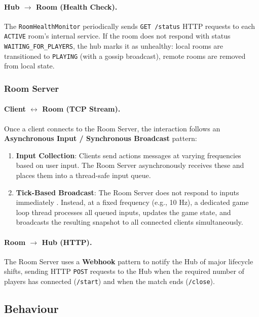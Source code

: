 \paragraph{Hub $\rightarrow$ Room (Health Check).}
The \texttt{RoomHealthMonitor} periodically sends \texttt{GET /status} HTTP requests to each \texttt{ACTIVE} room's internal service.
If the room does not respond with status \texttt{WAITING\_FOR\_PLAYERS}, the hub marks it as unhealthy: local rooms are transitioned to \texttt{PLAYING} (with a gossip broadcast), remote rooms are removed from local state.

\subsubsection{Room Server}

\paragraph{Client $\leftrightarrow$ Room (TCP Stream).}
Once a client connects to the Room Server, the interaction follows an \textbf{Asynchronous Input / Synchronous Broadcast} pattern:
\begin{enumerate}
  \item \textbf{Input Collection}: Clients send actions messages at varying frequencies based on user input. 
  The Room Server asynchronously receives these and places them into a thread-safe input queue.
  \item \textbf{Tick-Based Broadcast}: The Room Server does not respond to inputs immediately \cite{nystrom2014game}.
  Instead, at a fixed frequency (e.g., 10 Hz), a dedicated game loop thread processes all queued inputs, updates the game state, and broadcasts the resulting snapshot to all connected clients simultaneously.
\end{enumerate}

\paragraph{Room $\rightarrow$ Hub (HTTP).}
The Room Server uses a \textbf{Webhook} pattern to notify the Hub of major lifecycle shifts, sending HTTP \texttt{POST} requests to the Hub when the required number of players has connected (\texttt{/start}) and when the match ends (\texttt{/close}).

\subsection{Behaviour}\label{behaviour}

